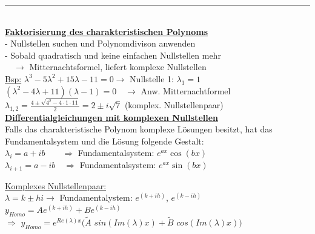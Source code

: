 \documentclass[6pt]{article}
\begin{document}
\begin{multicols*}{3}
	\vspace{-1mm}
  		\noindent\textcolor{gray}{\rule{9cm}{0.2pt}}
	\vspace{2mm}\\
	
	{\bf \underline{Faktorisierung des charakteristischen Polynoms} } 
	\vspace{3mm}\\
	- Nullstellen suchen und Polynomdivison anwenden\\
	- Sobald quadratisch und keine einfachen Nullstellen mehr \\
	 $\quad \rightarrow $ Mitternachtsformel, liefert komplexe Nullstellen \vspace{0mm}\\
	 
	 \underline{Bsp:} $\lambda^3-5\lambda^2 + 15 \lambda - 11 = 0  \rightarrow$ Nullstelle 1: $\lambda_1 = 1$ \\ $(\lambda^2 - 4\lambda + 11)(\lambda -1) = 0 \quad  \rightarrow $ Anw. Mitternachtformel \vspace{1mm}\\
	 		$\lambda_{1,2} = \frac{4 \pm \sqrt{4^2 - 4\cdot 1\cdot 11}}{2} = 2 \pm i\sqrt{7}$ (komplex. Nullstellenpaar)\vspace{2mm}\\
	 
	
	
	{\bf \underline{Differentialgleichungen mit komplexen Nullstellen} } \vspace{3mm}\\
	Falls das charakteristische Polynom komplexe L{\"o}sungen besitzt, hat das Fundamentalsystem und die L{\"o}sung folgende Gestalt: \vspace{0mm} \\
	
	$\lambda_i = a+ib \quad \quad \Rightarrow$ Fundamentalsystem: $e^{ax} \cos (bx)$  \\  
	$\lambda_{i+1} = a-ib \quad \Rightarrow$ Fundamentalsystem: $e^{ax} \sin (bx)$
				
	\vspace{3mm} 
	
	\underline {Komplexes Nullstellenpaar:} \vspace{1mm} \\
		$\lambda = k \pm hi \rightarrow $ Fundamentalystem: $e^{(k+ih)}$, $e^{(k-ih)}$ \vspace{1mm} \\
	$y_{Homo} = Ae^{(k+ih)} + Be^{(k-ih)}$ \vspace{1mm} \\
	$\Rightarrow$  $y_{Homo} = e^{Re(\lambda)x}(\tilde{A}$ $sin(Im(\lambda)x) + \tilde{B}$ $cos(Im(\lambda)x) )$ \vspace{2mm} \\
	

\end{multicols*}
\end{document}
